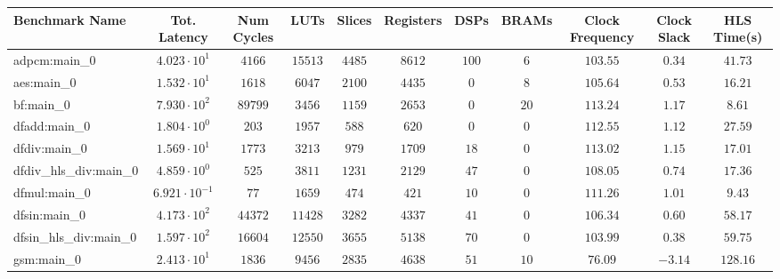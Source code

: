 \begin{tabular}{|l|c|c|c|c|c|c|c|c|c|c|}
\hline
Benchmark Name          & Tot. Latency            & Num Cycles & LUTs      & Slices    & Registers & DSPs    & BRAMs   & Clock Frequency & Clock Slack & HLS Time(s) \\
\hline
adpcm:main\_0           & $ 4.023 \cdot 10^{1}  $ & $ 4166   $ & $ 15513 $ & $ 4485  $ & $ 8612  $ & $ 100 $ & $ 6   $ & $ 103.55      $ & $ 0.34    $ & $ 41.73   $ \\
aes:main\_0             & $ 1.532 \cdot 10^{1}  $ & $ 1618   $ & $ 6047  $ & $ 2100  $ & $ 4435  $ & $ 0   $ & $ 8   $ & $ 105.64      $ & $ 0.53    $ & $ 16.21   $ \\
bf:main\_0              & $ 7.930 \cdot 10^{2}  $ & $ 89799  $ & $ 3456  $ & $ 1159  $ & $ 2653  $ & $ 0   $ & $ 20  $ & $ 113.24      $ & $ 1.17    $ & $ 8.61    $ \\
dfadd:main\_0           & $ 1.804 \cdot 10^{0}  $ & $ 203    $ & $ 1957  $ & $ 588   $ & $ 620   $ & $ 0   $ & $ 0   $ & $ 112.55      $ & $ 1.12    $ & $ 27.59   $ \\
dfdiv:main\_0           & $ 1.569 \cdot 10^{1}  $ & $ 1773   $ & $ 3213  $ & $ 979   $ & $ 1709  $ & $ 18  $ & $ 0   $ & $ 113.02      $ & $ 1.15    $ & $ 17.01   $ \\
dfdiv\_hls\_div:main\_0 & $ 4.859 \cdot 10^{0}  $ & $ 525    $ & $ 3811  $ & $ 1231  $ & $ 2129  $ & $ 47  $ & $ 0   $ & $ 108.05      $ & $ 0.74    $ & $ 17.36   $ \\
dfmul:main\_0           & $ 6.921 \cdot 10^{-1} $ & $ 77     $ & $ 1659  $ & $ 474   $ & $ 421   $ & $ 10  $ & $ 0   $ & $ 111.26      $ & $ 1.01    $ & $ 9.43    $ \\
dfsin:main\_0           & $ 4.173 \cdot 10^{2}  $ & $ 44372  $ & $ 11428 $ & $ 3282  $ & $ 4337  $ & $ 41  $ & $ 0   $ & $ 106.34      $ & $ 0.60    $ & $ 58.17   $ \\
dfsin\_hls\_div:main\_0 & $ 1.597 \cdot 10^{2}  $ & $ 16604  $ & $ 12550 $ & $ 3655  $ & $ 5138  $ & $ 70  $ & $ 0   $ & $ 103.99      $ & $ 0.38    $ & $ 59.75   $ \\
gsm:main\_0             & $ 2.413 \cdot 10^{1}  $ & $ 1836   $ & $ 9456  $ & $ 2835  $ & $ 4638  $ & $ 51  $ & $ 10  $ & $ 76.09       $ & $ -3.14   $ & $ 128.16  $ \\

\end{tabular}
